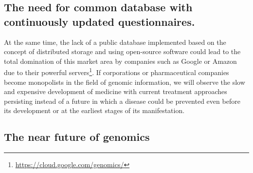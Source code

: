 \subsection[Database with continuously updated questionnaires]{%
  The need for common database with continuously updated questionnaires.}


At the same time, the lack of a public database implemented based on the concept of distributed storage and using open-source software could lead to the total domination of this market area by companies such as Google or Amazon due to their powerful servers\footnote{\url{https://cloud.google.com/genomics/}}. If corporations or pharmaceutical companies become monopolists in the field of genomic information, we will observe the slow and expensive development of medicine with current treatment approaches persisting instead of a future in which a disease could be prevented even before its development or at the earliest stages of its manifestation.



\subsection{The near future of genomics}

